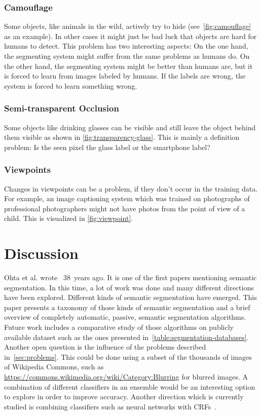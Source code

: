 \documentclass[technote,a4paper,leqno]{IEEEtran}
\begin{document}
\subsubsection{Camouflage}
Some objects, like animals in the wild, actively try to hide
(see~\cref{fig:camouflage} as an example). In other cases it might just be bad
luck that objects are hard for humans to detect. This problem has two
interesting aspects: On the one hand, the segmenting system might suffer from
the same problems as humans do. On the other hand, the segmenting system might
be better than humans are, but it is forced to learn from images labeled by
humans. If the labels are wrong, the system is forced to learn something wrong.
\subsubsection{Semi-transparent Occlusion}
Some objects like drinking glasses can be visible and still leave the object
behind them visible as shown in \cref{fig:transparency-glass}. This is mainly a
definition problem: Is the seen pixel the glass label or the smartphone label?
\subsubsection{Viewpoints}
Changes in viewpoints can be a problem, if they don't occur in the training
data. For example, an image captioning system which was trained on photographs
of professional photographers might not have photos from the point of view of
a child. This is visualized in \cref{fig:viewpoint}.
\section{Discussion}%
\label{sec:discussion}
Ohta et al. wrote~\cite{ohta1978analysis} 38~years ago. It is one of the first
papers mentioning semantic segmentation. In this time, a lot of work was done
and many different directions have been explored. Different kinds of semantic
segmentation have emerged.
This paper presents a taxonomy of those kinds of semantic segmentation and a
brief overview of completely automatic, passive, semantic segmentation
algorithms.
Future work includes a comparative study of those algorithms on publicly
available dataset such as the ones presented
in~\cref{table:segmentation-databases}. Another open question is the influence
of the problems described in~\cref{sec:problems}. This could be done using a
subset of the thousands of images of Wikipedia Commons, such as \href{https://commons.wikimedia.org/wiki/Category:Blurring}{https://commons.wikimedia.org/wiki/Category:Blurring} for blurred images.
A combination of different classifiers in an ensemble would be an interesting
option to explore in order to improve accuracy. Another direction which is
currently studied is combining classifiers such as neural networks with
\glspl{CRF}~\cite{zheng2015conditional}.
\end{document}
